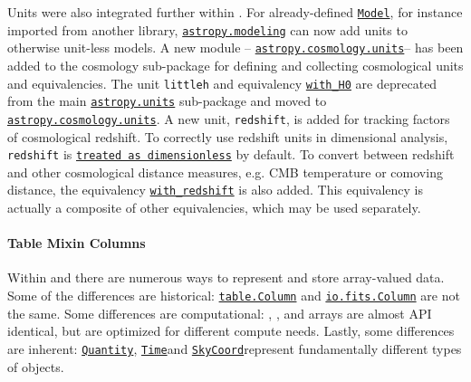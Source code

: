 \documentclass[modern]{aastex631}
\newcommand{\astropysubpkg}[1]{\href{http://docs.astropy.org/en/stable/#1/index.html}{\texttt{astropy.#1}}\xspace}
\newcommand{\astropycosmologyunits}{\href{https://docs.astropy.org/en/stable/cosmology/units.html}{\texttt{astropy.cosmology.units}}}
\newcommand{\astropyunits}{\astropysubpkg{units}}
\newcommand{\astropymodeling}{\astropysubpkg{modeling}}
\newcommand{\astropyapi}[2]{\href{https://docs.astropy.org/en/stable/api/astropy.#1.html}{#2}}
\newcommand{\astropyapidoc}[2]{\astropyapi{#1}{\texttt{#2}\xspace}}
\newcommand{\astropySkyCoord}{\astropyapidoc{coordinates.SkyCoord}{SkyCoord}}
\newcommand{\astropyModel}{\astropyapidoc{modeling.Model}{Model}}
\newcommand{\astropyTime}{\astropyapidoc{time.Time}{Time}}
\newcommand{\astropyQuantity}{\astropyapidoc{units.Quantity}{Quantity}}
\begin{document}
    Units were also integrated further within \astropypkg. For already-defined
    \astropyModel, for instance imported from another library, \astropymodeling
    can now add units to otherwise unit-less models.
    A new module –
    \astropycosmologyunits – has been added to the cosmology sub-package for
    defining and collecting cosmological units and equivalencies. The unit
    \texttt{littleh} and equivalency
    \astropyapidoc{cosmology.units.with_H0}{with\_H0} are deprecated from the
    main \astropyunits sub-package and moved to \astropycosmologyunits. A new
    unit, \texttt{redshift}, is added for tracking factors of cosmological
    redshift. To correctly use redshift units in dimensional analysis,
    \texttt{redshift} is
    \astropyapidoc{cosmology.units.dimensionless_redshift}{treated as
    dimensionless} by default. To convert between redshift and other
    cosmological distance measures, e.g. CMB temperature or comoving distance,
    the equivalency
    \astropyapidoc{cosmology.units.with_redshift}{with\_redshift}
    is also added. This equivalency is actually a composite of other
    equivalencies, which may be used separately.

  \paragraph{Table Mixin Columns}


    Within \astropypkg and \python there are numerous ways to represent and
    store array-valued data. Some of the differences are historical:
    \astropyapidoc{table.Column}{table.Column} and
    \astropyapidoc{io.fits.Column}{io.fits.Column} are not the same. Some
    differences are computational: , , and
     arrays are almost API identical, but are optimized for
    different compute needs. Lastly, some differences are inherent:
    \astropyQuantity, \astropyTime and \astropySkyCoord represent fundamentally
    different types of objects.
\end{document}
